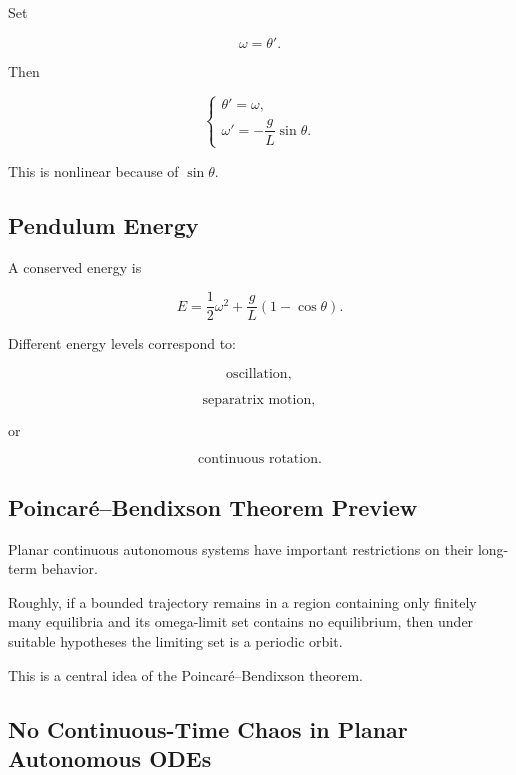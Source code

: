 Set

\[
\omega=\theta'.
\]

Then

\[
\boxed{
\begin{cases}
\theta'=\omega,\\
\omega'=
-\dfrac{g}{L}\sin\theta.
\end{cases}
}
\]

This is nonlinear because of \(\sin\theta\).

\subsection{Pendulum Energy}
\label{subsec:pendulum-energy}

A conserved energy is

\[
\boxed{
E
=
\frac12
\omega^2
+
\frac{g}{L}
(
1-\cos\theta
).
}
\]

Different energy levels correspond to:

\[
\boxed{
\text{oscillation},
}
\]

\[
\boxed{
\text{separatrix motion},
}
\]

or

\[
\boxed{
\text{continuous rotation}.
}
\]

\subsection{Poincaré--Bendixson Theorem Preview}
\label{subsec:poincare-bendixson-preview}

Planar continuous autonomous systems have important restrictions on their
long-term behavior.

Roughly, if a bounded trajectory remains in a region containing only
finitely many equilibria and its omega-limit set contains no equilibrium,
then under suitable hypotheses the limiting set is a periodic orbit.

This is a central idea of the Poincaré--Bendixson theorem.

\subsection{No Continuous-Time Chaos in Planar Autonomous ODEs}
\label{subsec:no-planar-continuous-chaos}

